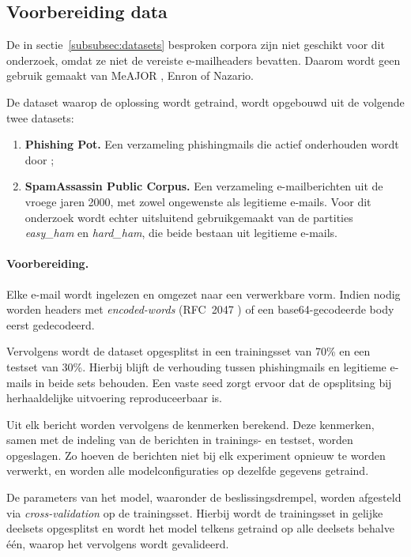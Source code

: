 \subsection{Voorbereiding data}
\label{subsec:voorbereiding-data}

De in sectie~\ref{subsubsec:datasets} besproken corpora zijn niet geschikt voor dit onderzoek, omdat ze niet de vereiste e-mailheaders bevatten. Daarom wordt geen gebruik gemaakt van MeAJOR \autocite{Mendes2025}, Enron \autocite{klimt2004} of Nazario.

De dataset waarop de oplossing wordt getraind, wordt opgebouwd uit de volgende twee datasets:
\begin{enumerate}
    \item \textbf{Phishing Pot.} Een verzameling phishingmails die actief onderhouden wordt door \textcite{PhishingPot};
    \item \textbf{SpamAssassin Public Corpus.} Een verzameling e-mailberichten uit de vroege jaren 2000, met zowel ongewenste als legitieme e-mails. Voor dit onderzoek wordt echter uitsluitend gebruikgemaakt van de partities \emph{easy\_ham} en \emph{hard\_ham}, die beide bestaan uit legitieme e-mails.
\end{enumerate}

\paragraph{Voorbereiding.} 
Elke e-mail wordt ingelezen en omgezet naar een verwerkbare vorm. Indien nodig worden headers met \emph{encoded-words} (RFC~2047 \autocite{Moore1996}) of een base64-gecodeerde body eerst gedecodeerd.
 
Vervolgens wordt de dataset opgesplitst in een trainingsset van 70\% en een testset van 30\%. Hierbij blijft de verhouding tussen phishingmails en legitieme e-mails in beide sets behouden. Een vaste seed zorgt ervoor dat de opsplitsing bij herhaaldelijke uitvoering reproduceerbaar is.

Uit elk bericht worden vervolgens de kenmerken berekend. Deze kenmerken, samen met de indeling van de berichten in trainings- en testset, worden opgeslagen. Zo hoeven de berichten niet bij elk experiment opnieuw te worden verwerkt, en worden alle modelconfiguraties op dezelfde gegevens getraind.

De parameters van het model, waaronder de beslissingsdrempel, worden afgesteld via \emph{cross-validation} op de trainingsset. Hierbij wordt de trainingsset in gelijke deelsets opgesplitst en wordt het model telkens getraind op alle deelsets behalve één, waarop het vervolgens wordt gevalideerd. 

